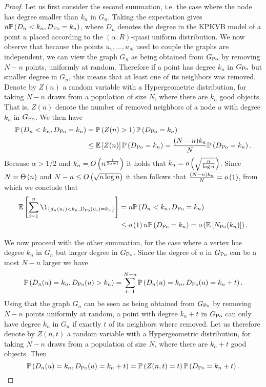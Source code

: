 \begin{proof}
Let us first consider the second summation, i.e. the case where the node has degree smaller than $k_n$ in $G_n$. Taking the expectation gives $n \mathbb{P}\left(D_n < k_n, D_{{\mathrm{Po}}} = k_n\right)$, where $D_n$ denotes the degree in the KPKVB model of a point $u$ placed according to the $(\alpha,R)$-quasi uniform distribution. We now observe that because the points $u_1, \dots, u_N$ used to couple the graphs are independent, we can view the graph $G_n$ as being obtained from $G_{{\mathrm{Po}}}$ by removing $N-n$ points, uniformly at random. Therefore if a point has degree $k_n$ in $G_{{\mathrm{Po}}}$ but smaller degree in $G_n$, this means that at least one of its neighbors was removed. Denote by $Z(n)$ a random variable with a Hypergeometric distribution, for taking $N-n$ draws from a population of size $N$, where there are $k_n$ good objects. That is, $Z(n)$ denote the number of removed neighbors of a node $u$ with degree $k_n$ in $G_{{\mathrm{Po}}}$. We then have
\begin{align*}
	\mathbb{P}\left(D_n < k_n, D_{{\mathrm{Po}}} = k_n\right) &= \mathbb{P}\left(Z(n) > 1\right)\mathbb{P}\left(D_{{\mathrm{Po}}} = k_n\right)\\
	&\le \mathbb{E}\left[Z(n)\right] \mathbb{P}\left(D_{{\mathrm{Po}}} = k_n\right) = \frac{(N-n) k_n}{N} \mathbb{P}\left(D_{{\mathrm{Po}}} = k_n\right).
\end{align*}
Because $\alpha > 1/2$ and $k_n = O\left(n^{\frac{1}{2\alpha+ 1}}\right)$ it holds that $k_n = o\left(\sqrt{\frac{n}{\log n}}\right)$. Since $N = \Theta\left(n\right)$ and $N - n \le O\left(\sqrt{n \log n}\right)$ it then follows that $\frac{(N-n) k_n}{N} = o\left(1\right)$, from which we conclude that
\begin{align*}
	\Exp{\sum_{i = 1}^n \1_{\left\{d_n(u_i) < k_n, D_{\Po}(u_i) = k_n\right\}}}
	&= n \Prob{D_n < k_n, D_{\Po} = k_n}\\
	&\le \smallO{1} n \Prob{D_{\Po} = k_n} = \smallO{\Exp{N_{\Po}(k_n)}}.
\end{align*}

We now proceed with the other summation, for the case where a vertex has degree $k_n$ in $G_n$ but larger degree in $G_{{\mathrm{Po}}}$. Since the degree of $u$ in $G_{{\mathrm{Po}}}$ can be a most $N-n$ larger we have
\[
	\mathbb{P}\left(D_n(u) = k_n, D_{{\mathrm{Po}}}(u) > k_n\right) = \sum_{t = 1}^{N - n} \mathbb{P}\left(D_n(u) = k_n, D_{{\mathrm{Po}}}(u) = k_n + t\right).
\]
Using that the graph $G_n$ can be seen as being obtained from $G_{{\mathrm{Po}}}$ by removing $N-n$ points uniformly at random, a point with degree $k_n + t$ in $G_{{\mathrm{Po}}}$ can only have degree $k_n$ in $G_n$ if exactly $t$ of its neighbors where removed. Let us therefore denote by $Z(n,t)$ a random variable with a Hypergeometric distribution, for taking $N-n$ draws from a population of size $N$, where there are $k_n + t$ good objects. Then
\[
	\mathbb{P}\left(D_n(u) = k_n, D_{{\mathrm{Po}}}(u) = k_n + t\right) = \mathbb{P}\left(Z(n,t) = t\right)\mathbb{P}\left(D_{{\mathrm{Po}}} = k_n + t\right).
\]


\end{proof}

